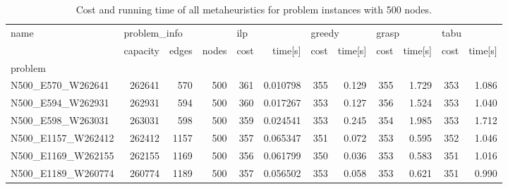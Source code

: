 \begin{landscape}

\begin{table}
\centering
\begin{tabular}{lrrrrrrrrrrr}
\toprule
name & \multicolumn{3}{l}{problem\_info} & \multicolumn{2}{l}{ilp} & \multicolumn{2}{l}{greedy} & \multicolumn{2}{l}{grasp} & \multicolumn{2}{l}{tabu} \\
{} &     capacity & edges & nodes & cost &   time[s] &   cost & time[s] &  cost & time[s] & cost & time[s] \\
problem            &              &       &       &      &           &        &         &       &         &      &         \\
\midrule
N500\_E570\_W262641  &       262641 &   570 &   500 &  361 &  0.010798 &    355 &   0.129 &   355 &   1.729 &  353 &   1.086 \\
N500\_E594\_W262931  &       262931 &   594 &   500 &  360 &  0.017267 &    353 &   0.127 &   356 &   1.524 &  353 &   1.040 \\
N500\_E598\_W263031  &       263031 &   598 &   500 &  359 &  0.024541 &    353 &   0.245 &   354 &   1.985 &  353 &   1.712 \\
N500\_E1157\_W262412 &       262412 &  1157 &   500 &  357 &  0.065347 &    351 &   0.072 &   353 &   0.595 &  352 &   1.046 \\
N500\_E1169\_W262155 &       262155 &  1169 &   500 &  356 &  0.061799 &    350 &   0.036 &   353 &   0.583 &  351 &   1.016 \\
N500\_E1189\_W260774 &       260774 &  1189 &   500 &  357 &  0.056502 &    353 &   0.058 &   353 &   0.621 &  351 &   0.990 \\
\bottomrule
\end{tabular}
\caption{Cost and running time of all metaheuristics for problem instances with 500 nodes.}
\label{table:500-results}
\end{table}

\end{landscape}
